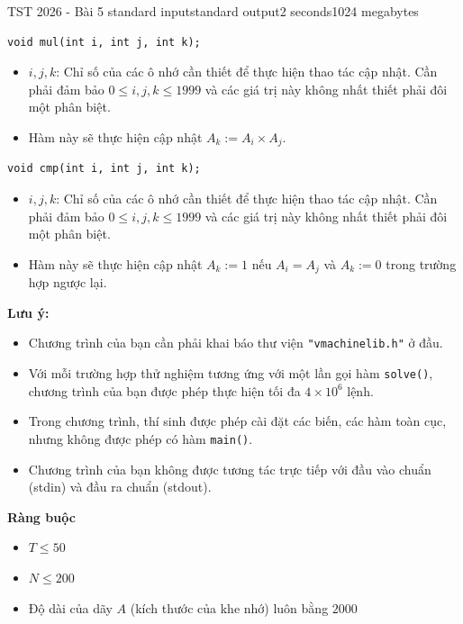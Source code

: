 \begin{problem}{TST 2026 - Bài 5 }{standard input}{standard output}{2 seconds}{1024 megabytes}
\begin{lstlisting}
void mul(int i, int j, int k);
\end{lstlisting}

\begin{itemize}
   \item $i,j,k$: Chỉ số của các ô nhớ cần thiết để thực hiện thao tác cập nhật. Cần phải đảm bảo $0\le i,j,k\le 1999$ và các giá trị này không nhất thiết phải đôi một phân biệt.
   \item Hàm này sẽ thực hiện cập nhật $A_k:=A_i\times A_j$.
\end{itemize}

\begin{lstlisting}
void cmp(int i, int j, int k);
\end{lstlisting}

\begin{itemize}
   \item $i,j,k$: Chỉ số của các ô nhớ cần thiết để thực hiện thao tác cập nhật. Cần phải đảm bảo $0\le i,j,k\le 1999$ và các giá trị này không nhất thiết phải đôi một phân biệt.
   \item Hàm này sẽ thực hiện cập nhật $A_k:=1$ nếu $A_i=A_j$ và $A_k:=0$ trong trường hợp ngược lại.
\end{itemize}

\textbf{Lưu ý:}
\begin{itemize}
   \item Chương trình của bạn cần phải khai báo thư viện \texttt{"vmachinelib.h"} ở đầu.
   \item Với mỗi trường hợp thử nghiệm tương ứng với một lần gọi hàm \texttt{solve()}, chương trình của bạn được phép thực hiện tối đa $4\times 10^6$ lệnh.
   \item Trong chương trình, thí sinh được phép cài đặt các biến, các hàm toàn cục, nhưng không được phép có hàm \texttt{main()}.
   \item Chương trình của bạn không được tương tác trực tiếp với đầu vào chuẩn (stdin) và đầu ra chuẩn (stdout).
\end{itemize}

\textbf{Ràng buộc}

\begin{itemize}
   \item $T \le 50$
   \item $N \le 200$
   \item Độ dài của dãy $A$ (kích thước của khe nhớ) luôn bằng $2000$
\end{itemize}


\end{problem}
